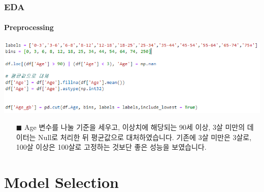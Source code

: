 \documentclass{beamer}
\begin{document}
\begin{frame}
\frametitle{EDA}
\framesubtitle{Preprocessing}

\centering
\includegraphics[scale=0.6]{age_gb code.png}

\begin{itemize}
\item[$\blacksquare$] {\footnotesize Age 변수를 나눌 기준을 세우고, 이상치에 해당되는 90세 이상, 3살 미만의 데이터는 Null로 처리한 뒤 평균값으로 대처하였습니다. 기존에 3살 미만은 3살로, 100살 이상은 100살로 고정하는 것보단 좋은 성능을 보였습니다.} 

\end{itemize}
\end{frame}


\section{Model Selection}
\end{document}
